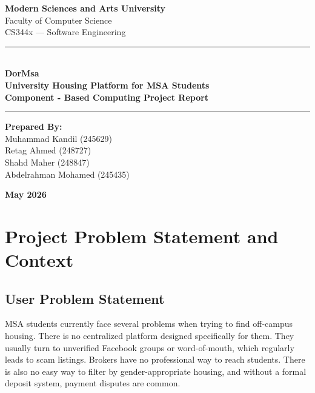 \documentclass[12pt,a4paper]{article}
\begin{document}
\begin{titlepage}
    \centering
    
    {\large\bfseries Modern Sciences and Arts University}\\[0.2cm]
    {\large Faculty of Computer Science}\\[0.2cm]
    {\large CS344x — Software Engineering}
    
    \vfill
    
    \color{msanavy}\rule{\linewidth}{1.5pt}\\[1.0cm]
    {\Huge\bfseries DorMsa}\\[0.5cm]
    {\large\bfseries\color{msagold} University Housing Platform for MSA Students}\\[1.0cm]
    {\Large\bfseries\color{msanavy} Component - Based Computing Project Report}\\[1.0cm]
    \color{msanavy}\rule{\linewidth}{1.5pt}
    
    \vfill
    
    \textbf{\color{msanavy}\large Prepared By:}\\[0.4cm]
    {\large
    Muhammad Kandil (245629)\\[0.15cm]
    Retag Ahmed (248727)\\[0.15cm]
    Shahd Maher (248847)\\[0.15cm]
    Abdelrahman Mohamed (245435)}
    
    \vfill
    {\large\bfseries\color{msanavy} May 2026}
\end{titlepage}

\newpage
\tableofcontents
\newpage

\section{Project Problem Statement and Context}

\subsection{User Problem Statement}
MSA students currently face several problems when trying to find off-campus housing. There is no centralized platform designed specifically for them. They usually turn to unverified Facebook groups or word-of-mouth, which regularly leads to scam listings. Brokers have no professional way to reach students. There is also no easy way to filter by gender-appropriate housing, and without a formal deposit system, payment disputes are common.
\end{document}
